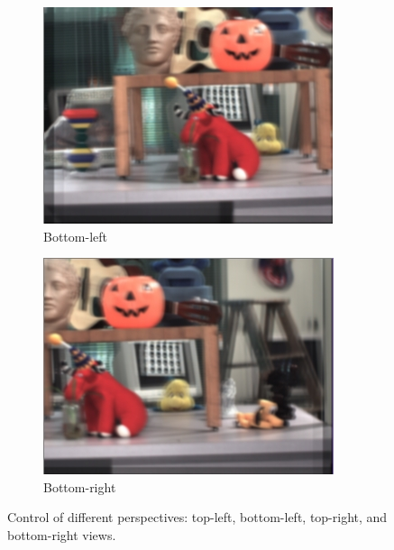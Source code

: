 \documentclass{article}
\begin{document}
\begin{figure}[htbp]
\begin{subfigure}[b]{0.23\textwidth}
        \centering
        \includegraphics[width=\textwidth]{view3.png} %
        \caption{Bottom-left} %
    \end{subfigure}
    \hfill
    \begin{subfigure}[b]{0.23\textwidth} %
        \centering
        \includegraphics[width=\textwidth]{view4.png} %
        \caption{Bottom-right} %
    \end{subfigure}
    
    \caption{Control of different perspectives: top-left, bottom-left, top-right, and bottom-right views.}
    \label{fig:view_control}
\end{figure}
\end{document}
